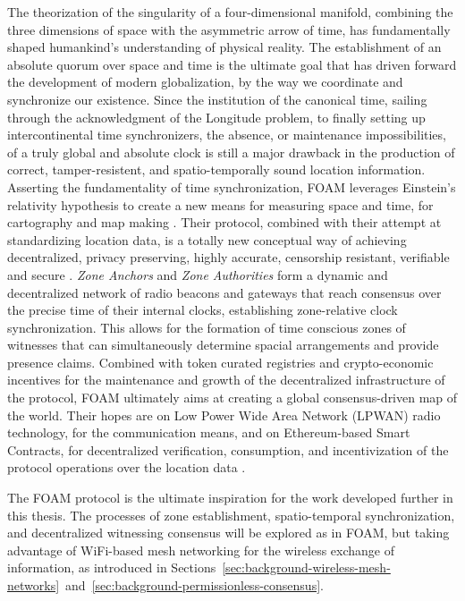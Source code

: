 The theorization of the singularity of a four-dimensional manifold, combining the three dimensions of space with the asymmetric arrow of time, has fundamentally shaped humankind's understanding of physical reality. The establishment of an absolute quorum over space and time is the ultimate goal that has driven forward the development of modern globalization, by the way we coordinate and synchronize our existence. Since the institution of the canonical time, sailing through the acknowledgment of the Longitude problem, to finally setting up intercontinental time synchronizers, the absence, or maintenance impossibilities, of a truly global and absolute clock is still a major drawback in the production of correct, tamper-resistent, and spatio-temporally sound location information. Asserting the fundamentality of time synchronization, FOAM leverages Einstein's relativity hypothesis to create a new means for measuring space and time, for cartography and map making \cite{king_2020}. Their protocol, combined with their attempt at standardizing location data, is a totally new conceptual way of achieving decentralized, privacy preserving, highly accurate, censorship resistant, verifiable and secure \pol{}. \emph{Zone Anchors} and \emph{Zone Authorities} form a dynamic and decentralized network of radio beacons and gateways that reach consensus over the precise time of their internal clocks, establishing zone-relative clock synchronization. This allows for the formation of time conscious zones of witnesses that can simultaneously determine spacial arrangements and provide presence claims. Combined with token curated registries and crypto-economic incentives for the maintenance and growth of the decentralized infrastructure of the protocol, FOAM ultimately aims at creating a global consensus-driven map of the world. Their hopes are on Low Power Wide Area Network (LPWAN) radio technology, for the communication means, and on Ethereum-based Smart Contracts, for decentralized verification, consumption, and incentivization of the protocol operations over the location data \cite{foam-white-paper}.

The FOAM protocol is the ultimate inspiration for the work developed further in this thesis. The processes of zone establishment, spatio-temporal synchronization, and decentralized witnessing consensus will be explored as in FOAM, but taking advantage of WiFi-based mesh networking for the wireless exchange of information, as introduced in Sections~\ref{sec:background-wireless-mesh-networks}~and~\ref{sec:background-permissionless-consensus}.